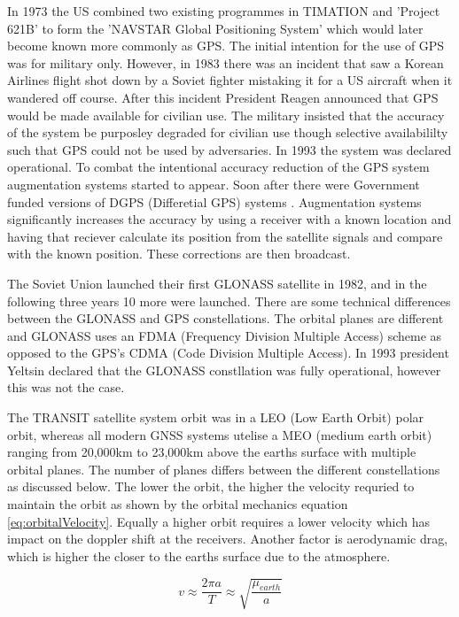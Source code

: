 In 1973 the US combined two existing programmes in TIMATION and 'Project 621B' to form the 'NAVSTAR Global Positioning System' which would later become known more
commonly as GPS. The initial intention for the use of GPS was for military only. However, in 1983 there was an incident that saw a Korean Airlines flight shot down by a
Soviet fighter mistaking it for a US aircraft when it wandered off course. After this incident President Reagen announced that GPS would be made available for civilian
use. The military insisted that the accuracy of the system be purposley degraded for civilian use though selective availabililty such that GPS could not be used by
adversaries. In 1993 the system was declared operational. To combat the intentional accuracy reduction of the GPS system augmentation systems started to appear. Soon
after there were Government funded versions of DGPS (Differetial GPS) systems \cite{RN43}. Augmentation systems significantly increases the accuracy by using a receiver
with a known location and having that reciever calculate its position from the satellite signals and compare with the known position. These corrections are then
broadcast. 

The Soviet Union launched their first GLONASS satellite in 1982, and in the following three years 10 more were launched. There are some technical differences between the
GLONASS and GPS constellations. The orbital planes are different and GLONASS uses an FDMA (Frequency Division Multiple Access) scheme as opposed to the GPS's CDMA (Code
Division Multiple Access). In 1993 president Yeltsin declared that the GLONASS constllation was fully operational, however this was not the case. 

The TRANSIT satellite system orbit was in a LEO (Low Earth Orbit) polar orbit, whereas all modern GNSS systems utelise a MEO (medium earth orbit) ranging from 20,000km to
23,000km above the earths surface with multiple orbital planes. The number of planes differs between the different constellations as discussed below. The lower the orbit,
the higher the velocity requried to maintain the orbit as shown by the orbital mechanics equation \ref{eq:orbitalVelocity}. Equally a higher orbit requires a lower
velocity which has impact on the doppler shift at the receivers. Another factor is aerodynamic drag, which is higher the closer to the earths surface due to the
atmosphere.

\begin{equation} \label{eq:orbitalVelocity}
    v \approx \frac{2\pi a}{T} \approx \sqrt{\frac{\mu_{earth}}{a}}
\end{equation} 

